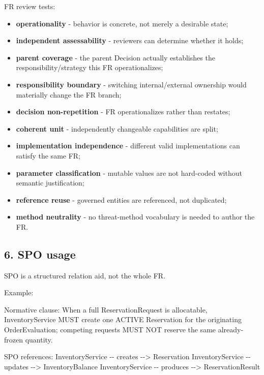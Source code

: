 \documentclass[
  10pt,
]{article}
\newenvironment{Shaded}{}{}
\newcommand{\NormalTok}[1]{#1}
\providecommand{\tightlist}{%
  \setlength{\itemsep}{0pt}\setlength{\parskip}{0pt}}
\begin{document}
FR review tests:

\begin{itemize}
\tightlist
\item
  \textbf{operationality} - behavior is concrete, not merely a desirable
  state;
\item
  \textbf{independent assessability} - reviewers can determine whether
  it holds;
\item
  \textbf{parent coverage} - the parent Decision actually establishes
  the responsibility/strategy this FR operationalizes;
\item
  \textbf{responsibility boundary} - switching internal/external
  ownership would materially change the FR branch;
\item
  \textbf{decision non-repetition} - FR operationalizes rather than
  restates;
\item
  \textbf{coherent unit} - independently changeable capabilities are
  split;
\item
  \textbf{implementation independence} - different valid implementations
  can satisfy the same FR;
\item
  \textbf{parameter classification} - mutable values are not hard-coded
  without semantic justification;
\item
  \textbf{reference reuse} - governed entities are referenced, not
  duplicated;
\item
  \textbf{method neutrality} - no threat-method vocabulary is needed to
  author the FR.
\end{itemize}

\subsection{6. SPO usage}\label{6-spo-usage}

SPO is a structured relation aid, not the whole FR.

Example:

\begin{Shaded}
\begin{Highlighting}[]
\NormalTok{Normative clause:}
\NormalTok{When a full ReservationRequest is allocatable, InventoryService MUST create one ACTIVE}
\NormalTok{Reservation for the originating OrderEvaluation; competing requests MUST NOT reserve the}
\NormalTok{same already{-}frozen quantity.}

\NormalTok{SPO references:}
\NormalTok{InventoryService {-}{-} creates {-}{-}\textgreater{} Reservation}
\NormalTok{InventoryService {-}{-} updates {-}{-}\textgreater{} InventoryBalance}
\NormalTok{InventoryService {-}{-} produces {-}{-}\textgreater{} ReservationResult}
\end{Highlighting}
\end{Shaded}
\end{document}
